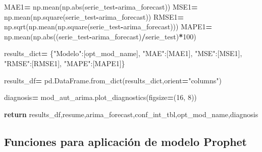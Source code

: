 \documentclass[
]{book}
\newenvironment{Shaded}{\begin{snugshade}}{\end{snugshade}}
\newcommand{\BuiltInTok}[1]{#1}
\newcommand{\ControlFlowTok}[1]{\textcolor[rgb]{0.13,0.29,0.53}{\textbf{#1}}}
\newcommand{\DecValTok}[1]{\textcolor[rgb]{0.00,0.00,0.81}{#1}}
\newcommand{\NormalTok}[1]{#1}
\newcommand{\OperatorTok}[1]{\textcolor[rgb]{0.81,0.36,0.00}{\textbf{#1}}}
\newcommand{\StringTok}[1]{\textcolor[rgb]{0.31,0.60,0.02}{#1}}
\begin{document}
\begin{Shaded}
\begin{Highlighting}[]
\NormalTok{    MAE1}\OperatorTok{=}\NormalTok{ np.mean(np.}\BuiltInTok{abs}\NormalTok{(serie\_test}\OperatorTok{{-}}\NormalTok{arima\_forecast))}
\NormalTok{    MSE1}\OperatorTok{=}\NormalTok{ np.mean(np.square(serie\_test}\OperatorTok{{-}}\NormalTok{arima\_forecast))}
\NormalTok{    RMSE1}\OperatorTok{=}\NormalTok{ np.sqrt(np.mean(np.square(serie\_test}\OperatorTok{{-}}\NormalTok{arima\_forecast)))}
\NormalTok{    MAPE1}\OperatorTok{=}\NormalTok{ np.mean(np.}\BuiltInTok{abs}\NormalTok{((serie\_test}\OperatorTok{{-}}\NormalTok{arima\_forecast)}\OperatorTok{/}\NormalTok{serie\_test)}\OperatorTok{*}\DecValTok{100}\NormalTok{)}
  
\NormalTok{    results\_dict}\OperatorTok{=}\NormalTok{ \{}\StringTok{"Modelo"}\NormalTok{:[opt\_mod\_name],}
                 \StringTok{"MAE"}\NormalTok{:[MAE1],}
                 \StringTok{"MSE"}\NormalTok{:[MSE1],}
                 \StringTok{"RMSE"}\NormalTok{:[RMSE1],}
                 \StringTok{"MAPE"}\NormalTok{:[MAPE1]\}}
                 
\NormalTok{    results\_df}\OperatorTok{=}\NormalTok{ pd.DataFrame.from\_dict(results\_dict,orient}\OperatorTok{=}\StringTok{"columns"}\NormalTok{)}
    
\NormalTok{    diagnosis}\OperatorTok{=}\NormalTok{  mod\_aut\_arima.plot\_diagnostics(figsize}\OperatorTok{=}\NormalTok{(}\DecValTok{16}\NormalTok{, }\DecValTok{8}\NormalTok{))}
  
    \ControlFlowTok{return}\NormalTok{ results\_df,resume,arima\_forecast,conf\_int\_tbl,opt\_mod\_name,diagnosis}
  
\end{Highlighting}
\end{Shaded}

\hypertarget{funciones-para-aplicaciuxf3n-de-modelo-prophet}{%
\subsection{Funciones para aplicación de modelo Prophet}\label{funciones-para-aplicaciuxf3n-de-modelo-prophet}}
\end{document}
